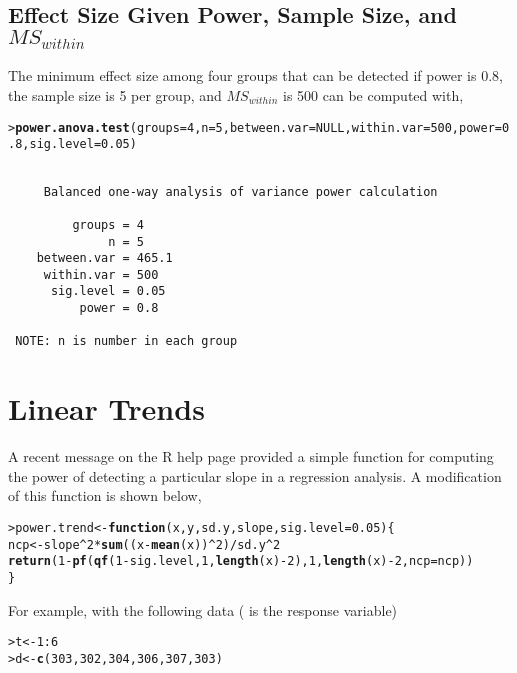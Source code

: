 \documentclass{article}\usepackage{graphicx, color}
\makeatletter
\newcommand{\hlfunctioncall}[1]{\textcolor[rgb]{0.501960784313725,0,0.329411764705882}{\textbf{#1}}}%
\newenvironment{kframe}{%
 \def\at@end@of@kframe{}%
 \ifinner\ifhmode%
  \def\at@end@of@kframe{\end{minipage}}%
  \begin{minipage}{\columnwidth}%
 \fi\fi%
 \def\FrameCommand##1{\hskip\@totalleftmargin \hskip-\fboxsep
 \colorbox{shadecolor}{##1}\hskip-\fboxsep
     \hskip-\linewidth \hskip-\@totalleftmargin \hskip\columnwidth}%
 \MakeFramed {\advance\hsize-\width
   \@totalleftmargin\z@ \linewidth\hsize
   \@setminipage}}%
 {\par\unskip\endMakeFramed%
 \at@end@of@kframe}
\newenvironment{knitrout}{}{} %
\makeatother
\begin{document}
\subsection{Effect Size Given Power, Sample Size, and $MS_{within}$}
The minimum effect size among four groups that can be detected if power is 0.8, the sample size is 5 per group, and $MS_{within}$ is 500 can be computed with,
\begin{knitrout}
\color{fgcolor}\begin{kframe}
\begin{alltt}
> \hlfunctioncall{power.anova.test}(groups=4,n=5,between.var=NULL,within.var=500,power=0.8,sig.level=0.05)
\end{alltt}
\begin{verbatim}

     Balanced one-way analysis of variance power calculation 

         groups = 4
              n = 5
    between.var = 465.1
     within.var = 500
      sig.level = 0.05
          power = 0.8

 NOTE: n is number in each group 
\end{verbatim}
\end{kframe}
\end{knitrout}


\section{Linear Trends}
A recent message on the R help page provided a simple function for computing the power of detecting a particular slope in a regression analysis.  A modification of this function is shown below,
\begin{knitrout}
\color{fgcolor}\begin{kframe}
\begin{alltt}
> power.trend <- \hlfunctioncall{function}(x,y,sd.y,slope,sig.level=0.05)\{
    ncp <- slope^2 * \hlfunctioncall{sum}((x - \hlfunctioncall{mean}(x))^2)/sd.y^2
    \hlfunctioncall{return}(1-\hlfunctioncall{pf}(\hlfunctioncall{qf}(1-sig.level,1,\hlfunctioncall{length}(x)-2),1,\hlfunctioncall{length}(x)-2,ncp=ncp))
 \}
\end{alltt}
\end{kframe}
\end{knitrout}


For example, with the following data ( is the response variable)
\begin{knitrout}
\color{fgcolor}\begin{kframe}
\begin{alltt}
> t <- 1:6
> d <- \hlfunctioncall{c}(303, 302, 304, 306, 307, 303)
\end{alltt}
\end{kframe}
\end{knitrout}
\end{document}

